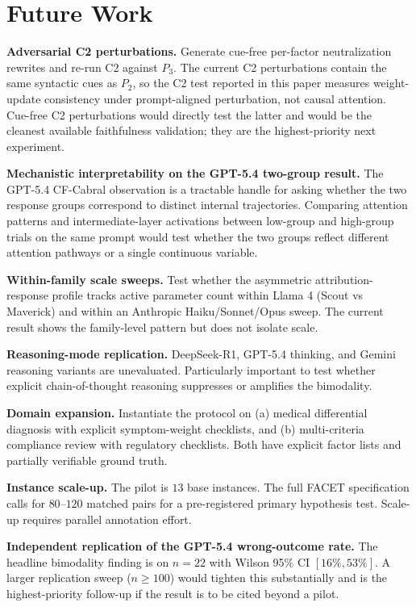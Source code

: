 \documentclass[11pt]{article}
\begin{document}
\section{Future Work}
\label{sec:future}

\textbf{Adversarial C2 perturbations.} Generate cue-free per-factor neutralization rewrites and re-run C2 against $P_3$. The current C2 perturbations contain the same syntactic cues as $P_2$, so the C2 test reported in this paper measures weight-update consistency under prompt-aligned perturbation, not causal attention. Cue-free C2 perturbations would directly test the latter and would be the cleanest available faithfulness validation; they are the highest-priority next experiment.

\textbf{Mechanistic interpretability on the GPT-5.4 two-group result.} The GPT-5.4 CF-Cabral observation is a tractable handle for asking whether the two response groups correspond to distinct internal trajectories. Comparing attention patterns and intermediate-layer activations between low-group and high-group trials on the same prompt would test whether the two groups reflect different attention pathways or a single continuous variable.

\textbf{Within-family scale sweeps.} Test whether the asymmetric attribution-response profile tracks active parameter count within Llama 4 (Scout vs Maverick) and within an Anthropic Haiku/Sonnet/Opus sweep. The current result shows the family-level pattern but does not isolate scale.

\textbf{Reasoning-mode replication.} DeepSeek-R1, GPT-5.4 thinking, and Gemini reasoning variants are unevaluated. Particularly important to test whether explicit chain-of-thought reasoning suppresses or amplifies the bimodality.

\textbf{Domain expansion.} Instantiate the protocol on (a) medical differential diagnosis with explicit symptom-weight checklists, and (b) multi-criteria compliance review with regulatory checklists. Both have explicit factor lists and partially verifiable ground truth.

\textbf{Instance scale-up.} The pilot is $13$ base instances. The full FACET specification calls for $80$--$120$ matched pairs for a pre-registered primary hypothesis test. Scale-up requires parallel annotation effort.

\textbf{Independent replication of the GPT-5.4 wrong-outcome rate.} The headline bimodality finding is on $n=22$ with Wilson 95\% CI $[16\%, 53\%]$. A larger replication sweep ($n \geq 100$) would tighten this substantially and is the highest-priority follow-up if the result is to be cited beyond a pilot.
\end{document}
